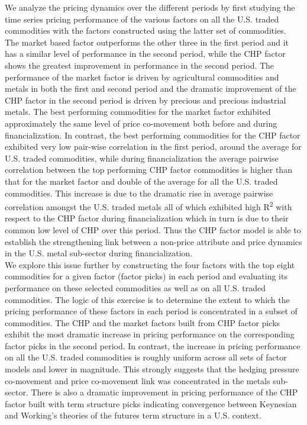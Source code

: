 \documentclass[11pt, letterpaper, doublespacing]{article}
\renewcommand{\footnote}{\endnote}
\let\rmarkdownfootnote\footnote%
\def\footnote{\protect\rmarkdownfootnote}
\begin{document}
We analyze the pricing dynamics over the different periods by first
studying the time series pricing performance of the various factors on
all the U.S. traded commodities with the factors constructed using the
latter set of commodities. The market based factor outperforms the other
three in the first period and it has a similar level of performance in
the second period, while the CHP factor shows the greatest improvement
in performance in the second period. The performance of the market
factor is driven by agricultural commodities and metals in both the
first and second period and the dramatic improvement of the CHP factor
in the second period is driven by precious and precious industrial
metals. The best performing commodities for the market factor exhibited
approximately the same level of price co-movement both before and during
financialization. In contrast, the best performing commodities for the
CHP factor exhibited very low pair-wise correlation in the first period,
around the average for U.S. traded commodities, while during
financialization the average pairwise correlation between the top
performing CHP factor commodities is higher than that for the market
factor and double of the average for all the U.S. traded commodities.
This increase is due to the dramatic rise in average pairwise
correlation amongst the U.S. traded metals all of which exhibited high
R\textsuperscript{2} with respect to the CHP factor during
financialization which in turn is due to their common low level of CHP
over this period. Thus the CHP factor model is able to establish the
strengthening link between a non-price attribute and price dynamics in
the U.S. metal sub-sector during financialization.\\
We explore this issue further by constructing the four factors with the
top eight commodities for a given factor (factor picks) in each
period\footnote{See section 2.2 for further details.} and evaluating its
performance on these selected commodities as well as on all U.S. traded
commodities. The logic of this exercise is to determine the extent to
which the pricing performance of these factors in each period is
concentrated in a subset of commodities. The CHP and the market factors
built from CHP factor picks exhibit the most dramatic increase in
pricing performance on the corresponding factor picks in the second
period. In contrast, the increase in pricing performance on all the U.S.
traded commodities is roughly uniform across all sets of factor models
and lower in magnitude. This strongly suggests that the hedging pressure
co-movement and price co-movement link was concentrated in the metals
sub-sector. There is also a dramatic improvement in pricing performance
of the CHP factor built with term structure picks indicating convergence
between Keynesian and Working's theories of the futures term structure
in a U.S. context.
\end{document}
